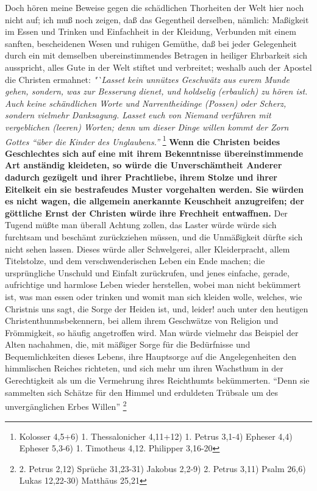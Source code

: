 Doch hören meine Beweise gegen die schädlichen Thorheiten der Welt hier noch
nicht auf; ich muß noch zeigen, daß das Gegentheil derselben, nämlich:
Maßigkeit
im Essen und Trinken und Einfachheit in der Kleidung, Verbunden mit einem
sanften, bescheidenen Wesen und ruhigen Gemüthe, daß bei jeder Gelegenheit durch
ein mit demselben ubereinstimmendes Betragen in heiliger Ehrbarkeit sich
ausspricht, alles Gute in der Welt stiftet und verbreitet; weshalb auch der
Apostel die Christen ermahnet:
\textit{"`Lasset kein unnützes Geschwätz aus eurem Munde
gehen, sondern, was zur Besserung dienet, und holdselig (erbaulich) zu hören
ist. Auch keine schändlichen Worte und Narrentheidinge (Possen) oder Scherz,
sondern vielmehr Danksagung. Lasset euch von Niemand verführen mit vergeblichen
(leeren) Worten; denn um dieser Dinge willen kommt der Zorn Gottes "`über die
Kinder des Unglaubens."'}
\footnote{
Kolosser 4,5+6)
1. Thessalonicher 4,11+12)
1. Petrus 3,1-4)
Epheser 4,4)
Epheser 5,3-6)
1. Timotheus 4,12.
Philipper 3,16-20}
\label{ref:18_08_vorbild_kleidung}\textbf{Wenn die Christen
beides Geschlechtes sich auf eine mit ihrem Bekenntnisse übereinstimmende Art
anständig kleideten, so würde die Unverschämtheit Anderer dadurch gezügelt und
ihrer Prachtliebe, ihrem Stolze und ihrer Eitelkeit ein sie bestrafeudes Muster
vorgehalten werden. Sie würden es nicht wagen, die allgemein anerkannte
Keuschheit anzugreifen; der göttliche Ernst der Christen würde ihre Frechheit
entwaffnen.} Der Tugend müßte man überall Achtung zollen, das Laster würde würde
sich furchtsam und beschämt zurückziehen müssen, und die Unmäßigkeit dürfte sich
nicht sehen lassen. Dieses würde aller Schwelgerei, aller Kleiderpracht, allem
Titelstolze, und dem verschwenderischen Leben ein Ende machen; die ursprüngliche
Unschuld und Einfalt zurückrufen, und jenes einfache, gerade, aufrichtige und
harmlose Leben wieder herstellen, wobei man nicht bekümmert ist, was man essen
oder trinken und womit man sich kleiden wolle, welches, wie Christnis uns sagt,
die Sorge der Heiden ist, und, leider! auch unter den heutigen
Christenthunmsbekennern, bei allem ihrem Geschwätze von Religion und
Frömmigkeit, so häufig angetroffen wird. Man würde vielmehr das Beispiel der
Alten nachahmen, die, mit mäßiger Sorge für die Bedürfnisse und Bequemlichkeiten
dieses Lebens, ihre Hauptsorge auf die Angelegenheiten den himmlischen
Reiches
richteten, und sich mehr um ihren Wachsthum in der Gerechtigkeit als um die
Vermehrung ihres Reichthumts bekümmerten. "`Denn sie sammelten sich Schätze für
den Himmel und erduldeten Trübsale um des unvergänglichen Erbes
Willen"'
\footnote{
2. Petrus 2,12)
Sprüche 31,23-31)
Jakobus 2,2-9)
2. Petrus 3,11)
Psalm 26,6)
Lukas  12,22-30)
Matthäus 25,21}

